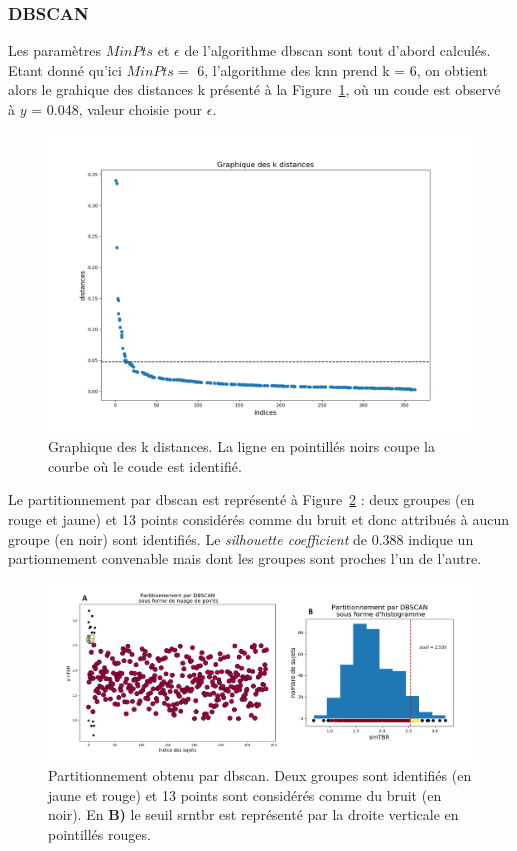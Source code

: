 \subsubsection{DBSCAN}

Les paramètres $MinPts$ et $\epsilon$ de l'algorithme \gls{dbscan} sont tout d'abord calculés. Etant donné qu'ici $MinPts = $ 6, 
l'algorithme des \gls{knn} prend k = 6, on obtient alors le grahique des distances k présenté à la Figure~\ref{Figure:tbr_dbscan_kdistance_plot}, 
où un coude est observé à $y$ = 0.048, valeur choisie pour $\epsilon$.

\begin{figure}[h!]
  \centering
	\includegraphics[width=0.7\linewidth]{figures/chapter-4/tbr-dbscan-knn-plot} 
  \caption{Graphique des k distances. La ligne en pointillés noirs coupe la courbe où le coude est identifié.}
  \label{Figure:tbr_dbscan_kdistance_plot}
\end{figure}

Le partitionnement par \gls{dbscan} est représenté à Figure~\ref{Figure:tbr_dbscan_clustering_plot} : deux groupes (en rouge et jaune) et 13 
points considérés comme du bruit et donc attribués à aucun groupe (en noir) sont identifiés. Le \textit{silhouette coefficient} de 0.388 
indique un partionnement convenable mais dont les groupes sont proches l'un de l'autre. 

\begin{figure}[h!]
  \centering
	\includegraphics[width=1.0\linewidth]{figures/chapter-4/tbr-dbscan-clustering-plot} 
  \caption{Partitionnement obtenu par \gls{dbscan}. Deux groupes sont identifiés (en jaune et rouge) et 13 points sont considérés comme du bruit (en noir).
	En \textbf{B)} le seuil \gls{srntbr} est représenté par la droite verticale en pointillés rouges.}
  \label{Figure:tbr_dbscan_clustering_plot}
\end{figure}

